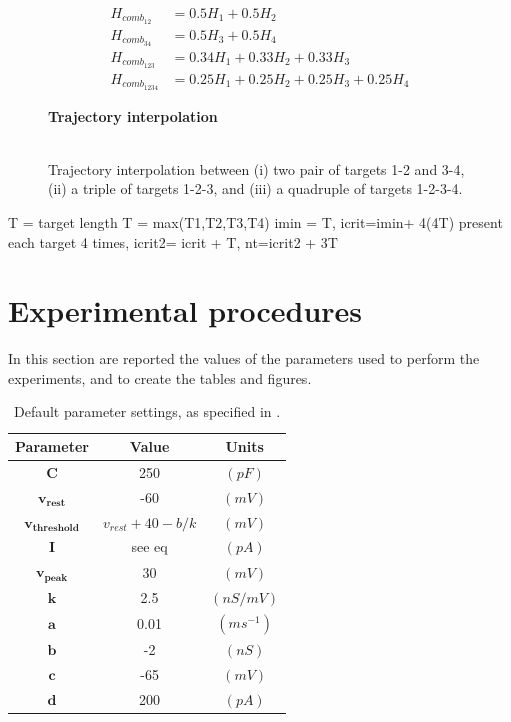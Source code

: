 \documentclass[10pt,a4paper, final]{report} %
\begin{document}
\begin{align}
H_{comb_{12}}   &= 0.5 H_1 + 0.5 H_2\\
H_{comb_{34}}   &= 0.5 H_3 + 0.5 H_4\\
H_{comb_{123}}  &= 0.34 H_1 + 0.33 H_2 + 0.33 H_3\\
H_{comb_{1234}} &= 0.25 H_1 + 0.25 H_2 + 0.25 H_3 + 0.25 H_4
\end{align}

\begin{figure}[H]
\centering
\textbf{Trajectory interpolation}
\\
\\
\caption{Trajectory interpolation between (i) two pair of targets 1-2 and 3-4, (ii) a triple of targets 1-2-3, and (iii) a quadruple of targets 1-2-3-4.}
\label{fig:interpolate_trajectories}
\end{figure}

T = target length
T = max(T1,T2,T3,T4)
imin = T, icrit=imin+ 4(4T) present each target 4 times, icrit2= icrit + T, nt=icrit2 + 3T

\section{Experimental procedures}
In this section are reported the values of the parameters used to perform the experiments, and to create the tables and figures.

\begin{table}[H]
\centering
\begin{tabular}{ccc}
\toprule
Parameter & Value & Units\\
\midrule
$\bm{C}$ 			&	250	& $(pF)$\\
$\bm{v_{rest}}$		& 	-60	& $(mV)$\\
$\bm{v_{threshold}}$& 	$v_{rest} + 40 - b/k$	& $(mV)$\\
$\bm{I}$ 			& 	see eq	& $(pA)$\\
$\bm{v_{peak}}$		& 	30	& $(mV)$\\
$\bm{k}$			&	2.5	& $(nS/mV)$\\
$\bm{a}$			&  0.01	& $(ms^{-1})$\\
$\bm{b}$			&  -2	& $(nS)$\\
$\bm{c}$			&	-65	& $(mV)$\\
$\bm{d}$ 			&	200	& $(pA)$\\
\bottomrule
\end{tabular}
\caption{Default parameter settings, as specified in \cite{nicola2017supervised}.}
\label{tab:default_izhikevich_parameters}
\end{table}
\end{document}
